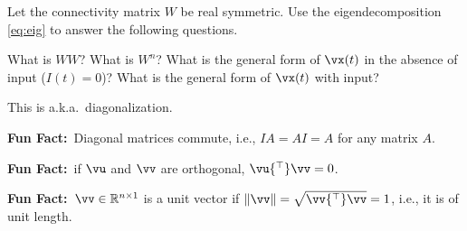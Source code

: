 \documentclass[a4paper,11pt]{exam}
\newcounter{ct}
\newcommand{\trp}{{^\top}} %
\newcommand{\norm}[1]{\ensuremath{\Vert{#1}\Vert}}
\newcommand{\field}[1]{\ensuremath{\mathbb{#1}}}
\newcommand{\reals}{\field{R}}
\newcommand{\funfact}{\textbf{Fun Fact:}~}
\begin{document}
\begin{questions}
\question Let the connectivity matrix $W$ be real symmetric. Use the eigendecomposition \eqref{eq:eig} to answer the following questions.
\begin{parts}
\subpart What is $WW$?
\subpart What is $W^n$?
\subpart What is the general form of $\vx(t)$ in the absence of input ($I(t) = 0$)?
\subpart What is the general form of $\vx(t)$ with input?
\end{parts}

This is a.k.a.~diagonalization.

\clearpage

\begin{tcolorbox}
\funfact Diagonal matrices commute, i.e., $IA = AI = A$ for any matrix $A$.
\end{tcolorbox}


\question

\begin{tcolorbox}
    \funfact if $\vu$ and $\vv$ are orthogonal, $\vu\trp \vv = 0$.
\end{tcolorbox}

\begin{tcolorbox}\funfact $\vv \in \reals^{n \times 1}$ is a unit vector if $\norm{\vv} = \sqrt{\vv\trp \vv} = 1$, i.e., it is of unit length.\end{tcolorbox}
\end{questions}
\end{document}
